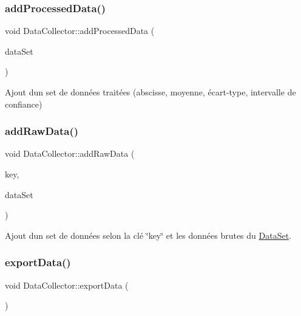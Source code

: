 \mbox{\label{classDataCollector_afd44db46dab8f105d4b36ef91a169090}} 
\subsubsection{\texorpdfstring{add\+Processed\+Data()}{addProcessedData()}}
{\footnotesize\ttfamily void Data\+Collector\+::add\+Processed\+Data (\begin{DoxyParamCaption}\item[{\hyperlink{classDataSet}{Data\+Set}}]{data\+Set }\end{DoxyParamCaption})}



Ajout d\textquotesingle{}un set de données traitées (abscisse, moyenne, écart-\/type, intervalle de confiance) 

\mbox{\label{classDataCollector_a3a7379e572a3123d83772ca0dd79f3b6}} 
\subsubsection{\texorpdfstring{add\+Raw\+Data()}{addRawData()}}
{\footnotesize\ttfamily void Data\+Collector\+::add\+Raw\+Data (\begin{DoxyParamCaption}\item[{std\+::string}]{key,  }\item[{\hyperlink{classDataSet}{Data\+Set}}]{data\+Set }\end{DoxyParamCaption})}



Ajout d\textquotesingle{}un set de données selon la clé \char`\"{}key\char`\"{} et les données brutes du \hyperlink{classDataSet}{Data\+Set}. 

\mbox{\label{classDataCollector_a6af99e22f24d045d607cb708866b9ce2}} 
\subsubsection{\texorpdfstring{export\+Data()}{exportData()}}
{\footnotesize\ttfamily void Data\+Collector\+::export\+Data (\begin{DoxyParamCaption}{ }\end{DoxyParamCaption})}



